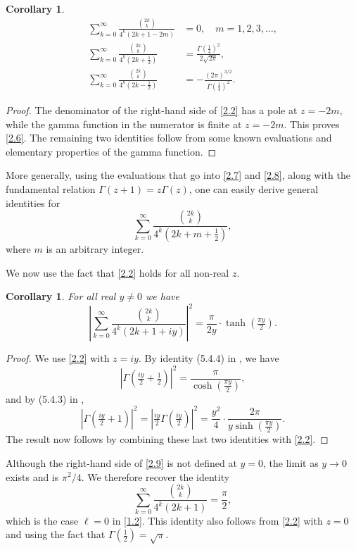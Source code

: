 \documentclass{amsart}
\newtheorem{corollary}[theorem]{Corollary}
\theoremstyle{definition}
\theoremstyle{remark}
\numberwithin{equation}{section}
\begin{document}
\begin{corollary}\label{cor:2.2}
\begin{align}
\sum_{k=0}^\infty\frac{\binom{2k}{k}}{4^k(2k+1-2m)} &=0,\quad 
m=1,2,3,\ldots,\label{2.6}\\
\sum_{k=0}^\infty\frac{\binom{2k}{k}}{4^k(2k+\frac{1}{2})} 
&=\frac{\Gamma(\tfrac{1}{4})^2}{2\sqrt{2\pi}},\label{2.7}\\
\sum_{k=0}^\infty\frac{\binom{2k}{k}}{4^k(2k-\frac{1}{2})} 
&=-\frac{(2\pi)^{3/2}}{\Gamma(\tfrac{1}{4})^2}.\label{2.8}
\end{align}
\end{corollary}

\begin{proof}
The denominator of the right-hand side of \eqref{2.2} has a pole at $z=-2m$,
while the gamma function in the numerator is finite at $z=-2m$. This proves 
\eqref{2.6}. The remaining two identities follow from some known evaluations
and elementary properties of the gamma function.
\end{proof}

More generally, using the evaluations that go into \eqref{2.7} and 
\eqref{2.8}, along with the fundamental relation $\Gamma(z+1)=z\Gamma(z)$, 
one can easily derive general identities for 
\[
\sum_{k=0}^\infty\frac{\binom{2k}{k}}{4^k(2k+m+\frac{1}{2})},
\]
where $m$ is an arbitrary integer.

We now use the fact that \eqref{2.2} holds for all non-real $z$.

\begin{corollary}\label{cor:2.3}
For all real $y\neq 0$ we have
\begin{equation}\label{2.9}
\left|\sum_{k=0}^\infty\frac{\binom{2k}{k}}{4^k(2k+1+iy)}\right|^2
=\frac{\pi}{2y}\cdot\tanh(\tfrac{\pi y}{2}).
\end{equation}
\end{corollary}

\begin{proof}
We use \eqref{2.2} with $z=iy$. By identity (5.4.4) in \cite{DLMF}, we have
\[
\left|\Gamma(\tfrac{iy}{2}+\tfrac{1}{2})\right|^2
=\frac{\pi}{\cosh(\tfrac{\pi y}{2})},
\]
and by (5.4.3) in \cite{DLMF},
\[
\left|\Gamma(\tfrac{iy}{2}+1)\right|^2
=\left|\tfrac{iy}{2}\Gamma(\tfrac{iy}{2})\right|^2
=\frac{y^2}{4}\cdot\frac{2\pi}{y\sinh(\tfrac{\pi y}{2})}.
\]
The result now follows by combining these last two identities with 
\eqref{2.2}.
\end{proof}

Although the right-hand side of \eqref{2.9} is not defined at $y=0$, the 
limit as $y\to 0$ exists and is $\pi^2/4$. We therefore recover the
identity
\[
\sum_{k=0}^\infty\frac{\binom{2k}{k}}{4^k(2k+1)} =\frac{\pi}{2},
\]
which is the case $\ell=0$ in \eqref{1.2}. This identity also follows from 
\eqref{2.2} with $z=0$ and using the fact that $\Gamma(\frac{1}{2})=\sqrt{\pi}$.
\end{document}
